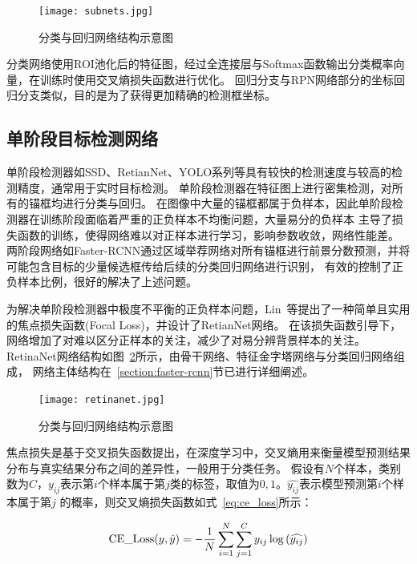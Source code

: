 \begin{figure}                  
  \centering                   
  \texttt{[image: subnets.jpg]}                   
  \caption{分类与回归网络结构示意图}                   
  \label{fig:subnets}      
\end{figure}   

分类网络使用ROI池化后的特征图，经过全连接层与Softmax函数输出分类概率向量，在训练时使用交叉熵损失函数进行优化。
回归分支与RPN网络部分的坐标回归分支类似，目的是为了获得更加精确的检测框坐标。

\subsection{单阶段目标检测网络}
单阶段检测器如SSD、RetianNet、YOLO系列等具有较快的检测速度与较高的检测精度，通常用于实时目标检测。
单阶段检测器在特征图上进行密集检测，对所有的锚框均进行分类与回归。
在图像中大量的锚框都属于负样本，因此单阶段检测器在训练阶段面临着严重的正负样本不均衡问题，大量易分的负样本
主导了损失函数的训练，使得网络难以对正样本进行学习，影响参数收敛，网络性能差。
两阶段网络如Faster-RCNN通过区域举荐网络对所有锚框进行前景分数预测，并将可能包含目标的少量候选框传给后续的分类回归网络进行识别，
有效的控制了正负样本比例，很好的解决了上述问题。

为解决单阶段检测器中极度不平衡的正负样本问题，Lin~\cite{lin2017focal}等提出了一种简单且实用的焦点损失函数(Focal Loss)，并设计了RetianNet网络。
在该损失函数引导下，网络增加了对难以区分正样本的关注，减少了对易分辨背景样本的关注。RetinaNet网络结构如图~\ref{fig:retinanet}所示，由骨干网络、特征金字塔网络与分类回归网络组成，
网络主体结构在~\ref{section:faster-rcnn}节已进行详细阐述。

\begin{figure}                     
  \centering                      
  \texttt{[image: retinanet.jpg]}                      
  \caption{分类与回归网络结构示意图}                      
  \label{fig:retinanet}       
\end{figure}   

焦点损失是基于交叉损失函数提出，在深度学习中，交叉熵用来衡量模型预测结果分布与真实结果分布之间的差异性，一般用于分类任务。
假设有$N$个样本，类别数为$C$，$y_{ij}$表示第$i$个样本属于第$j$类的标签，取值为$0, 1$。$\hat{y_{ij}}$表示模型预测第$i$个样本属于第$j$
的概率，则交叉熵损失函数如式~\ref{eq:ce_loss}所示：

\begin{equation}   
  {\rm{CE}}\_{\rm{Loss}}(y,\hat y) =  - \frac{1}{N}\sum\limits_{i = 1}^N {\sum\limits_{j = 1}^C {{y_{ij}}} } \log \left( {\widehat {{y_{ij}}}} \right)
  \label{eq:ce_loss} 
\end{equation}

